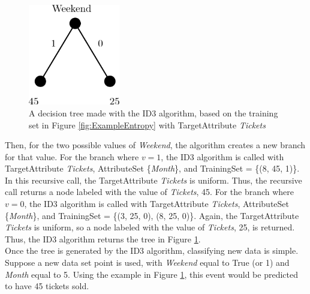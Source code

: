 \begin{figure}[H]
  \centering
  \includegraphics[width=4cm]{figures/ID3Example.png}
  \caption{A decision tree made with the ID3 algorithm, based on the training set in Figure \ref{fig:ExampleEntropy} with TargetAttribute \textit{Tickets}}
  \label{fig:ID3Example}
\end{figure}
Then, for the two possible values of \textit{Weekend}, the algorithm creates a new branch for that value. For the branch where $v=1$, the ID3 algorithm is called with TargetAttribute \textit{Tickets}, AttributeSet \{\textit{Month}\}, and TrainingSet = \{(8, 45, 1)\}. In this recursive call, the TargetAttribute \textit{Tickets} is uniform. Thus, the recursive call returns a node labeled with the value of \textit{Tickets}, 45. For the branch where $v=0$, the ID3 algorithm is called with TargetAttribute \textit{Tickets}, AttributeSet \{\textit{Month}\}, and TrainingSet = \{(3, 25, 0), (8, 25, 0)\}. Again, the TargetAttribute \textit{Tickets} is uniform, so a node labeled with the value of \textit{Tickets}, 25, is returned. Thus, the ID3 algorithm returns the tree in Figure \ref{fig:ID3Example}.\\

Once the tree is generated by the ID3 algorithm, classifying new data is simple. Suppose a new data set point is used, with \textit{Weekend} equal to True (or 1) and \textit{Month} equal to 5. Using the example in Figure \ref{fig:ID3Example}, this event would be predicted to have 45 tickets sold.\\

